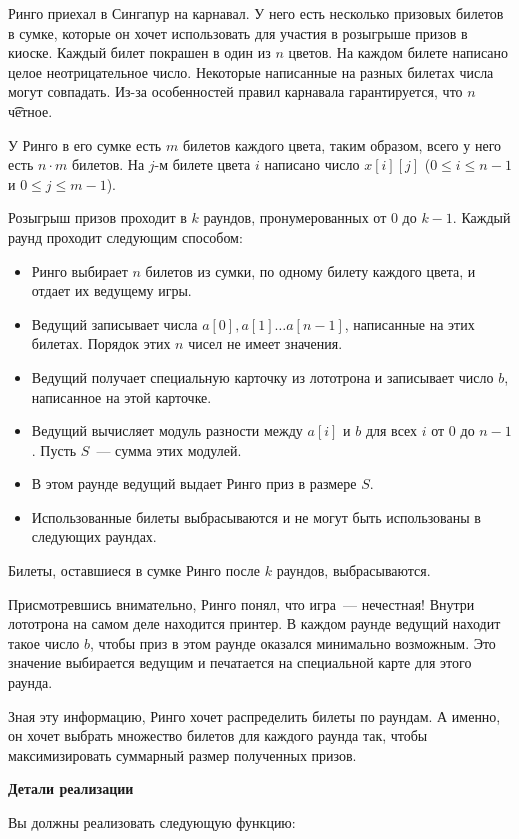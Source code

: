 Ринго приехал в Сингапур на карнавал. У него есть несколько призовых билетов в сумке, которые он хочет использовать для участия в розыгрыше призов в киоске. Каждый билет покрашен в один из $n$ цветов. На каждом билете написано целое неотрицательное число. Некоторые написанные на разных билетах числа могут совпадать. Из-за особенностей правил карнавала гарантируется, что $n$ \t{четное}. 

У Ринго в его сумке есть $m$ билетов каждого цвета, таким образом, всего у него есть $n \cdot m$ билетов. На $j$-м билете цвета $i$ написано число $x[i][j]$ ($0 \leq i \leq n-1$ и $0 \leq j \leq m-1$).

Розыгрыш призов проходит в $k$ раундов, пронумерованных от $0$ до $k-1$. Каждый раунд проходит следующим способом:
\begin{itemize}
\item Ринго выбирает $n$ билетов из сумки, по одному билету каждого цвета, и отдает их ведущему игры.
\item Ведущий записывает числа $a[0], a[1] \ldots a[n-1]$, написанные на этих билетах. Порядок этих $n$ чисел не имеет значения.
\item Ведущий получает специальную карточку из лототрона и записывает число $b$, написанное на этой карточке.
\item Ведущий вычисляет модуль разности между $a[i]$ и $b$ для всех $i$ от $0$ до $n-1$. Пусть $S$~--- сумма этих модулей.
\item В этом раунде ведущий выдает Ринго приз в размере $S$.
\item Использованные билеты выбрасываются и не могут быть использованы в следующих раундах.
\end{itemize}

Билеты, оставшиеся в сумке Ринго после $k$ раундов, выбрасываются. 

Присмотревшись внимательно, Ринго понял, что игра~--- нечестная! Внутри лототрона на самом деле находится принтер. В каждом раунде ведущий находит такое число $b$, чтобы приз в этом раунде оказался минимально возможным. Это значение выбирается ведущим и печатается на специальной карте для этого раунда. 

Зная эту информацию, Ринго хочет распределить билеты по раундам. А именно, он хочет выбрать множество билетов для каждого раунда так, чтобы максимизировать суммарный размер полученных призов.

\textbf{Детали реализации}

Вы должны реализовать следующую функцию:

